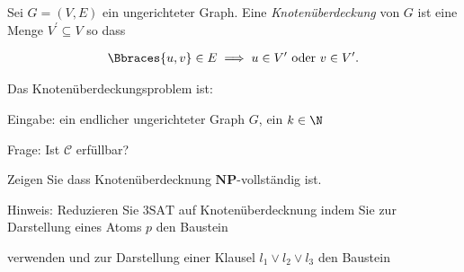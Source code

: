 
\begin{exercise}

Sei $G = (V, E)$ ein ungerichteter Graph.
Eine \textit{Knotenüberdeckung} von $G$ ist eine Menge $V^\prime \subseteq V$ so dass

\begin{align*}
    \Bbraces{u, v} \in E
    \implies
    u \in V^\prime ~\text{oder}~ v \in V^\prime.
\end{align*}

Das Knotenüberdeckungsproblem ist:

\begin{center}
    \begin{hetzlbox}[title = Knotenüberdeckung]
    
        Eingabe:
        ein endlicher ungerichteter Graph $G$, ein $k \in \N$
        
        Frage:
        Ist $\mathcal C$ erfüllbar?
    
    \end{hetzlbox}    
\end{center}

Zeigen Sie dass Knotenüberdecknung $\mathbf{NP}$-vollständig ist.

\begin{itshape}
    Hinweis:
    Reduzieren Sie $\mathrm{3SAT}$ auf Knotenüberdecknung indem Sie zur Darstellung eines Atoms $p$ den Baustein

    \begin{center}
    \end{center}

    verwenden und zur Darstellung einer Klausel $l_1 \lor l_2 \lor l_3$ den Baustein

    \begin{center}
    \end{center}

\end{itshape}

\end{exercise}


\begin{solution}

\phantom{}

\end{solution}


